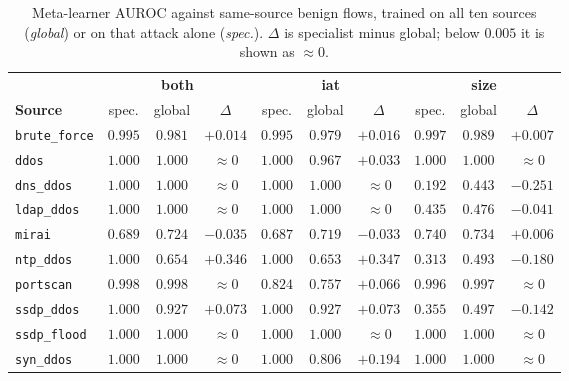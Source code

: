 \begin{table}[t]
\centering
\caption[Global model against per-attack specialists]{Meta-learner AUROC against
same-source benign flows, trained on all ten sources (\emph{global}) or on that attack
alone (\emph{spec.}). $\Delta$ is specialist minus global; below $0.005$ it is shown as
$\approx\!0$.}
\label{tab:eval-perattack}
\footnotesize
\setlength{\tabcolsep}{4pt}
\begin{tabular}{l ccc ccc ccc}
\toprule
& \multicolumn{3}{c}{\textbf{both}} & \multicolumn{3}{c}{\textbf{iat}} & \multicolumn{3}{c}{\textbf{size}} \\
\cmidrule(lr){2-4}\cmidrule(lr){5-7}\cmidrule(lr){8-10}
\textbf{Source} & spec. & global & $\Delta$ & spec. & global & $\Delta$ & spec. & global & $\Delta$ \\
\midrule
\texttt{brute\_force} & $0.995$ & $0.981$ & $+0.014$ & $0.995$ & $0.979$ & $+0.016$ & $0.997$ & $0.989$ & $+0.007$ \\
\texttt{ddos}         & $1.000$ & $1.000$ & $\approx\!0$ & $1.000$ & $0.967$ & $+0.033$ & $1.000$ & $1.000$ & $\approx\!0$ \\
\texttt{dns\_ddos}    & $1.000$ & $1.000$ & $\approx\!0$ & $1.000$ & $1.000$ & $\approx\!0$ & $0.192$ & $0.443$ & $-0.251$ \\
\texttt{ldap\_ddos}   & $1.000$ & $1.000$ & $\approx\!0$ & $1.000$ & $1.000$ & $\approx\!0$ & $0.435$ & $0.476$ & $-0.041$ \\
\texttt{mirai}        & $0.689$ & $0.724$ & $-0.035$ & $0.687$ & $0.719$ & $-0.033$ & $0.740$ & $0.734$ & $+0.006$ \\
\texttt{ntp\_ddos}    & $1.000$ & $0.654$ & $+0.346$ & $1.000$ & $0.653$ & $+0.347$ & $0.313$ & $0.493$ & $-0.180$ \\
\texttt{portscan}     & $0.998$ & $0.998$ & $\approx\!0$ & $0.824$ & $0.757$ & $+0.066$ & $0.996$ & $0.997$ & $\approx\!0$ \\
\texttt{ssdp\_ddos}   & $1.000$ & $0.927$ & $+0.073$ & $1.000$ & $0.927$ & $+0.073$ & $0.355$ & $0.497$ & $-0.142$ \\
\texttt{ssdp\_flood}  & $1.000$ & $1.000$ & $\approx\!0$ & $1.000$ & $1.000$ & $\approx\!0$ & $1.000$ & $1.000$ & $\approx\!0$ \\
\texttt{syn\_ddos}    & $1.000$ & $1.000$ & $\approx\!0$ & $1.000$ & $0.806$ & $+0.194$ & $1.000$ & $1.000$ & $\approx\!0$ \\
\bottomrule
\end{tabular}
\end{table}

